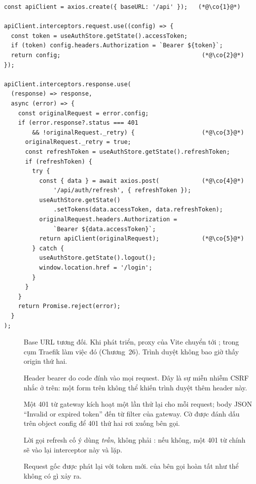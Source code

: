 \begin{lstlisting}
const apiClient = axios.create({ baseURL: '/api' });   (*@\co{1}@*)

apiClient.interceptors.request.use((config) => {
  const token = useAuthStore.getState().accessToken;
  if (token) config.headers.Authorization = `Bearer ${token}`;
  return config;                                        (*@\co{2}@*)
});

apiClient.interceptors.response.use(
  (response) => response,
  async (error) => {
    const originalRequest = error.config;
    if (error.response?.status === 401
        && !originalRequest._retry) {                   (*@\co{3}@*)
      originalRequest._retry = true;
      const refreshToken = useAuthStore.getState().refreshToken;
      if (refreshToken) {
        try {
          const { data } = await axios.post(            (*@\co{4}@*)
              '/api/auth/refresh', { refreshToken });
          useAuthStore.getState()
              .setTokens(data.accessToken, data.refreshToken);
          originalRequest.headers.Authorization =
              `Bearer ${data.accessToken}`;
          return apiClient(originalRequest);            (*@\co{5}@*)
        } catch {
          useAuthStore.getState().logout();
          window.location.href = '/login';
        }
      }
    }
    return Promise.reject(error);
  }
);
\end{lstlisting}

\begin{description}
  \item[] Base URL tương đối. Khi phát triển, proxy của Vite
  chuyển  tới ; trong cụm Traefik làm
  việc đó (Chương~26). Trình duyệt không bao giờ thấy origin thứ hai.
  \item[] Header bearer do code đính vào mọi request. Đây là sự
  miễn nhiễm CSRF nhắc ở trên: một form trên  không
  thể khiến trình duyệt thêm header này.
  \item[] Một 401 từ gateway kích hoạt một lần thử lại cho mỗi
  request; body JSON ``Invalid or expired token'' đến từ filter
   của gateway. Cờ được đánh dấu trên
  object config để 401 thứ hai rơi xuống bên gọi.
  \item[] Lời gọi refresh cố ý dùng  \emph{trần},
  không phải : nếu không, một 401 từ chính
   sẽ vào lại interceptor này và lặp.
  \item[] Request gốc được phát lại với token mới. 
  của bên gọi hoàn tất như thể không có gì xảy ra.
\end{description}

